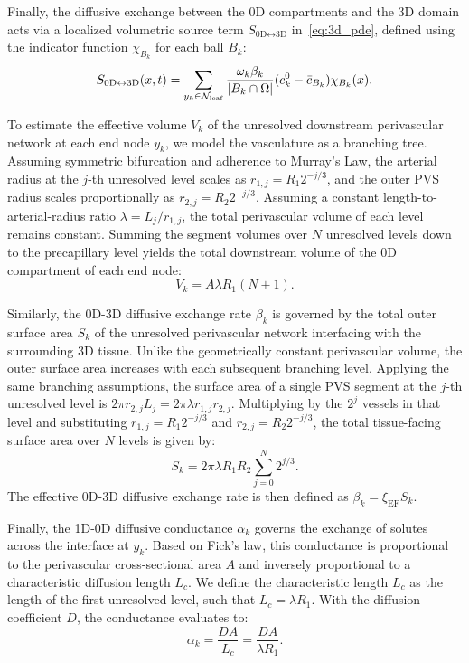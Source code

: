 \documentclass[fleqn,10pt]{wlscirep}
\begin{document}
Finally, the diffusive exchange between the 0D compartments and the 3D domain acts via a localized volumetric source term $S_{\text{0D} \leftrightarrow \text{3D}}$ in~\eqref{eq:3d_pde}, defined using the indicator function $\chi_{B_k}$ for each ball $B_k$:
\begin{equation}
  S_{\text{0D} \leftrightarrow \text{3D}}(x, t) = \sum_{y_k \in \mathcal{N}_{\rm leaf}} \frac{\omega_k \beta_k}{|B_k \cap \Omega|} (c^0_k - \bar{c}_{B_k}) \chi_{B_k}(x).
  \label{eq:3d_source}
\end{equation}

To estimate the effective volume $V_k$ of the unresolved downstream perivascular network at each end node $y_k$, we model the vasculature as a branching tree. Assuming symmetric bifurcation and adherence to Murray's Law, the arterial radius at the $j$-th unresolved level scales as $r_{1,j} = R_1 2^{-j/3}$, and the outer PVS radius scales proportionally as $r_{2,j} = R_2 2^{-j/3}$. Assuming a constant length-to-arterial-radius ratio $\lambda = L_j / r_{1,j}$, the total perivascular volume of each level remains constant. Summing the segment volumes over $N$ unresolved levels down to the precapillary level yields the total downstream volume of the 0D compartment of each end node:
\begin{equation}
  V_k = A \lambda R_1 (N + 1).
  \label{eq:effective_volume}
\end{equation}

Similarly, the 0D-3D diffusive exchange rate $\beta_k$ is governed by the total outer surface area $S_k$ of the unresolved perivascular network interfacing with the surrounding 3D tissue. Unlike the geometrically constant perivascular volume, the outer surface area increases with each subsequent branching level. Applying the same branching assumptions, the surface area of a single PVS segment at the $j$-th unresolved level is $2 \pi r_{2,j} L_j = 2 \pi \lambda r_{1,j} r_{2,j}$. Multiplying by the $2^j$ vessels in that level and substituting $r_{1,j} = R_1 2^{-j/3}$ and $r_{2,j} = R_2 2^{-j/3}$, the total tissue-facing surface area over $N$ levels is given by:
\begin{equation}
  S_k = 2 \pi \lambda R_1 R_2 \sum_{j=0}^{N} 2^{j/3}.
  \label{eq:surface_area}
\end{equation}
The effective 0D-3D diffusive exchange rate is then defined as $\beta_k = \xi_{\text{EF}} S_k$.

Finally, the 1D-0D diffusive conductance $\alpha_k$ governs the exchange of solutes across the interface at $y_k$. Based on Fick's law, this conductance is proportional to the perivascular cross-sectional area $A$ and inversely proportional to a characteristic diffusion length $L_c$. We define the characteristic length $L_c$ as the length of the first unresolved level, such that $L_c = \lambda R_1$. With the diffusion coefficient $D$, the conductance evaluates to:
\begin{equation}
  \alpha_k = \frac{D A}{L_c} = \frac{D A}{\lambda R_1}.
  \label{eq:conductance}
\end{equation}
\end{document}
